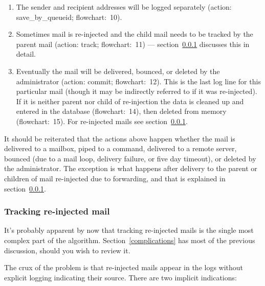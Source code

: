 \documentclass[a4paper,12pt,draft]{article}
\begin{document}
\begin{enumerate}

    \item The sender and recipient addresses will be logged separately
        (action: save\_by\_queueid; flowchart:~10).

    \item Sometimes mail is re-injected and the child mail needs to be
        tracked by the parent mail (action: track; flowchart:~11) ---
        section~\ref{tracking-re-injected-mail} discusses this in detail.

    \item Eventually the mail will be delivered, bounced, or deleted by the
        administrator (action: commit; flowchart:~12).  This is the last
        log line for this particular mail (though it may be indirectly
        referred to if it was re-injected).  If it is neither parent nor
        child of re-injection the data is cleaned up and entered in the
        database (flowchart:~14), then deleted from memory (flowchart:~15).  For
        re-injected mails see section~\ref{tracking-re-injected-mail}.

\end{enumerate}

It should be reiterated that the actions above happen whether the mail is
delivered to a mailbox, piped to a command, delivered to a remote server,
bounced (due to a mail loop, delivery failure, or five day timeout), or
deleted by the administrator.  The exception is what happens after delivery
to the parent or children of mail re-injected due to forwarding, and that
is explained in section~\ref{tracking-re-injected-mail}.

\subsubsection{Tracking re-injected mail}

\label{tracking-re-injected-mail}

It's probably apparent by now that tracking re-injected mails is the single
most complex part of the algorithm.  Section~\ref{complications} has most
of the previous discussion, should you wish to review it.  

The crux of the problem is that re-injected mails appear in the logs
without explicit logging indicating their source.  There are two implicit
indications:
\end{document}
